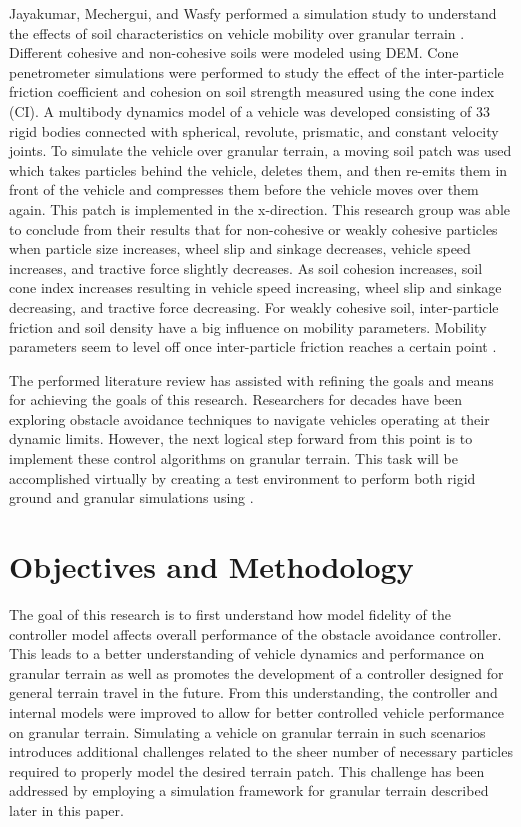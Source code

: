 \documentclass[12pt,onecolumn]{report}
\newcommand{\CHRONO}{{\sffamily{{Chrono}}}}
\begin{document}
Jayakumar, Mechergui, and Wasfy performed a simulation study to understand the effects of soil characteristics on vehicle mobility over granular terrain \cite{SoilCharacteristics2017}. Different cohesive and non-cohesive soils were modeled using DEM. Cone penetrometer simulations were performed to study the effect of the inter-particle friction coefficient and cohesion on soil strength measured using the cone index (CI). A multibody dynamics model of a vehicle was developed consisting of 33 rigid bodies connected with spherical, revolute, prismatic, and constant velocity joints. To simulate the vehicle over granular terrain, a moving soil patch was used which takes particles behind the vehicle, deletes them, and then re-emits them in front of the vehicle and compresses them before the vehicle moves over them again. This patch is implemented in the x-direction. This research group was able to conclude from their results that for non-cohesive or weakly cohesive particles when particle size increases, wheel slip and sinkage decreases, vehicle speed increases, and tractive force slightly decreases. As soil cohesion increases, soil cone index increases resulting in vehicle speed increasing, wheel slip and sinkage decreasing, and tractive force decreasing. For weakly cohesive soil, inter-particle friction and soil density have a big influence on mobility parameters. Mobility parameters seem to level off once inter-particle friction reaches a certain point \cite{SoilCharacteristics2017}.

The performed literature review has assisted with refining the goals and means for achieving the goals of this research. Researchers for decades have been exploring obstacle avoidance techniques to navigate vehicles operating at their dynamic limits. However, the next logical step forward from this point is to implement these control algorithms on granular terrain. This task will be accomplished virtually by creating a test environment to perform both rigid ground and granular simulations using {\CHRONO}. 


\section{Objectives and Methodology}\label{s:ObjectivesMethodology}

The goal of this research is to first understand how model fidelity of the controller model affects overall performance of the obstacle avoidance controller. This leads to a better understanding of vehicle dynamics and performance on granular terrain as well as promotes the development of a controller designed for general terrain travel in the future. From this understanding, the controller and internal models were improved to allow for better controlled vehicle performance on granular terrain. Simulating a vehicle on granular terrain in such scenarios introduces additional challenges related to the sheer number of necessary particles required to properly model the desired terrain patch. This challenge has been addressed by employing a simulation framework for granular terrain described later in this paper.
\end{document}
